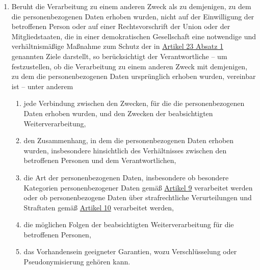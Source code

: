 \begin{enumerate}
  \item Beruht die Verarbeitung zu einem anderen Zweck als zu demjenigen, zu dem die personenbezogenen Daten erhoben
   wurden, nicht auf der Einwilligung der betroffenen Person oder auf einer Rechtsvorschrift der Union oder der
   Mitgliedstaaten, die in einer demokratischen Gesellschaft eine notwendige und verhältnismäßige Maßnahme zum Schutz
   der in \hyperref[itm:23-1]{Artikel 23 Absatz 1} genannten Ziele darstellt, so berücksichtigt der Verantwortliche --
   um festzustellen, ob die Verarbeitung zu einem anderen Zweck mit demjenigen, zu dem die personenbezogenen Daten
   ursprünglich erhoben wurden, vereinbar ist -- unter anderem
  \label{itm:06-4}

  \begin{enumerate}
  
    \item jede Verbindung zwischen den Zwecken, für die die personenbezogenen Daten erhoben wurden, und den Zwecken der
     beabsichtigten Weiterverarbeitung,
    \label{itm:06-4a}

    \item den Zusammenhang, in dem die personenbezogenen Daten erhoben wurden, insbesondere hinsichtlich des
     Verhältnisses zwischen den betroffenen Personen und dem Verantwortlichen,
    \label{itm:06-4b}

    \item die Art der personenbezogenen Daten, insbesondere ob besondere Kategorien personenbezogener Daten gemäß
     \hyperref[ch:09]{Artikel 9} verarbeitet werden oder ob personenbezogene Daten über strafrechtliche Verurteilungen
      und Straftaten gemäß \hyperref[ch:10]{Artikel 10} verarbeitet werden,
    \label{itm:06-4c}

    \item die möglichen Folgen der beabsichtigten Weiterverarbeitung für die betroffenen Personen,
    \label{itm:06-4d}

    \item das Vorhandensein geeigneter Garantien, wozu Verschlüsselung oder Pseudonymisierung gehören kann.
    \label{itm:06-4e}

  \end{enumerate}

\end{enumerate}


